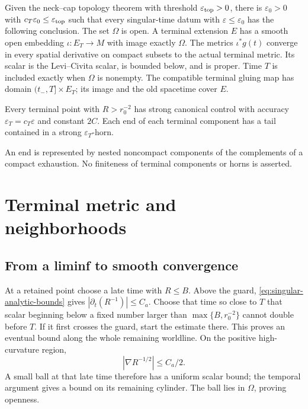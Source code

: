 \begin{theorem}
\label{thm:singular-m31}
Given the neck--cap topology theorem with threshold
$\varepsilon_{\rm top}>0$, there is $\varepsilon_0>0$ with
$c_T\varepsilon_0\leq\varepsilon_{\rm top}$ such that every
singular-time datum with $\varepsilon\leq\varepsilon_0$ has the
following conclusion. The set $\Omega$ is open. A terminal extension
$E$ has a smooth open embedding $\iota:E_T\to M$ with image exactly
$\Omega$. The metrics $\iota^*g(t)$ converge in every spatial derivative
on compact subsets to the actual terminal metric. Its scalar is the
Levi--Civita scalar, is bounded below, and is proper. Time $T$ is included
exactly when $\Omega$ is nonempty. The compatible terminal gluing map
has domain $(t_-,T]\times E_T$; its image and the old spacetime cover $E$.

Every terminal point with $R>r_0^{-2}$ has strong canonical control with
accuracy $\varepsilon_T=c_T\varepsilon$ and constant $2C$.
Each end of each terminal component has a tail contained in a strong
$\varepsilon_T$-horn.
\end{theorem}

An end is represented by nested noncompact components of the complements
of a compact exhaustion. No finiteness of terminal components or horns
is asserted.

\section{Terminal metric and neighborhoods}
\label{sec:singular-terminal}

\subsection{From a liminf to smooth convergence}

At a retained point choose a late time with $R\leq B$. Above the guard,
\eqref{eq:singular-analytic-bounds} gives
$|\partial_t(R^{-1})|\leq C_a$. Choose that time so close to $T$ that
scalar beginning below a fixed number larger than
$\max\{B,r_0^{-2}\}$ cannot double before $T$. If it first crosses
the guard, start the estimate there. This proves an eventual bound along
the whole remaining worldline. On the positive high-curvature region,
\[
                  |\nabla R^{-1/2}|\leq C_a/2.
\]
A small ball at that late time therefore has a uniform scalar bound;
the temporal argument gives a bound on its remaining cylinder. The ball
lies in $\Omega$, proving openness.


